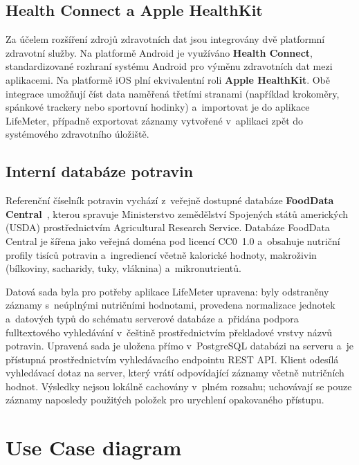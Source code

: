 \subsection*{Health Connect a Apple HealthKit}

Za účelem rozšíření zdrojů zdravotních dat jsou integrovány dvě
platformní zdravotní služby. Na platformě Android je využíváno
\textbf{Health Connect}, standardizované rozhraní systému Android
pro výměnu zdravotních dat mezi aplikacemi. Na platformě iOS
plní ekvivalentní roli \textbf{Apple HealthKit}. Obě integrace
umožňují číst data naměřená třetími stranami (například krokoměry,
spánkové trackery nebo sportovní hodinky) a~importovat je do
aplikace LifeMeter, případně exportovat záznamy vytvořené v~aplikaci
zpět do systémového zdravotního úložiště.

\subsection*{Interní databáze potravin}

Referenční číselník potravin vychází z~veřejně dostupné databáze
\textbf{FoodData Central}~\cite{usda2024fdc}, kterou spravuje
Ministerstvo zemědělství Spojených států amerických (USDA) prostřednictvím
Agricultural Research Service. Databáze FoodData Central je šířena
jako veřejná doména pod licencí CC0~1.0 a~obsahuje nutriční profily
tisíců potravin a~ingrediencí včetně kalorické hodnoty, makroživin
(bílkoviny, sacharidy, tuky, vláknina) a~mikronutrientů.

Datová sada byla pro potřeby aplikace LifeMeter upravena: byly
odstraněny záznamy s~neúplnými nutričními hodnotami, provedena
normalizace jednotek a~datových typů do schématu serverové
databáze a~přidána podpora fulltextového vyhledávání v~češtině
prostřednictvím překladové vrstvy názvů potravin. Upravená sada
je uložena přímo v~PostgreSQL databázi na serveru a~je přístupná
prostřednictvím vyhledávacího endpointu REST API. Klient
odesílá vyhledávací dotaz na server, který vrátí odpovídající
záznamy včetně nutričních hodnot. Výsledky nejsou lokálně
cachovány v~plném rozsahu; uchovávají se pouze záznamy naposledy
použitých položek pro urychlení opakovaného přístupu.

\section{Use Case diagram}

